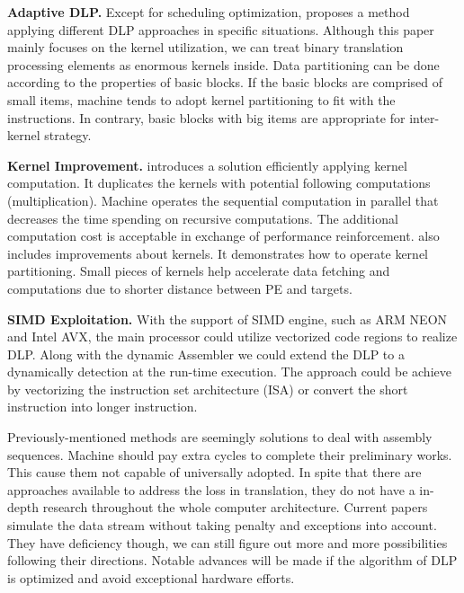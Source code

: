 \documentclass[sigconf, nonacm, natbib=false]{acmart}
\begin{document}
{\bf Adaptive DLP.} Except for scheduling optimization, \parencite{adaptive_dlp} proposes a method applying different DLP approaches in specific situations. Although this paper mainly focuses on the kernel utilization, we can treat binary translation processing elements as enormous kernels inside. Data partitioning can be done according to the properties of basic blocks. If the basic blocks are comprised of small items, machine tends to adopt kernel partitioning to fit with the instructions. In contrary, basic blocks with big items are appropriate for inter-kernel strategy. 

{\bf Kernel Improvement.} \parencite{dlp_in_streaming} introduces a solution efficiently applying kernel computation. It duplicates the kernels with potential following computations (multiplication). Machine operates the sequential computation in parallel that decreases the time spending on recursive computations. The additional computation cost is acceptable in exchange of performance reinforcement. \parencite{adaptive_dlp} also includes improvements about kernels. It demonstrates how to operate kernel partitioning. Small pieces of kernels help accelerate data fetching and computations due to shorter distance between PE and targets. 

{\bf SIMD Exploitation.} 
With the support of SIMD engine, such as ARM NEON and Intel AVX, the main processor could utilize vectorized code regions to realize DLP. Along with the dynamic Assembler we could extend the DLP to a dynamically detection at the run-time execution. The approach could be achieve by vectorizing the instruction set architecture (ISA) or convert the short instruction into longer instruction. 

Previously-mentioned methods are seemingly solutions to deal with assembly sequences. Machine should pay extra cycles to complete their preliminary works. This cause them not capable of universally adopted. In spite that there are approaches available to address the loss in translation, they do not have a in-depth research throughout the whole computer architecture. Current papers simulate the data stream without taking penalty and exceptions into account. They have deficiency though, we can still figure out more and more possibilities following their directions. Notable advances will be made if the algorithm of DLP is optimized and avoid exceptional hardware efforts.
\end{document}
